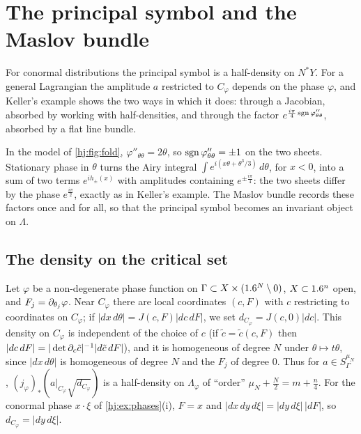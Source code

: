 \section{The principal symbol and the Maslov bundle}\label{hj:sec:lagrangian-symbol}

For conormal distributions the principal symbol is a half-density on $N^*Y$. For a
general Lagrangian the amplitude $a$ restricted to $C_\varphi$ depends on the phase
$\varphi$, and Keller's example shows the two ways in which it does: through a
Jacobian, absorbed by working with half-densities, and through the factor
$e^{\frac{i\pi}4\operatorname{sgn}\varphi''_{\theta\theta}}$, absorbed by a flat line bundle.

\begin{discussion}
In the model of \cref{hj:fig:fold}, $\varphi''_{\theta\theta}=2\theta$, so
$\operatorname{sgn}\varphi''_{\theta\theta}=\pm1$ on the two sheets. Stationary phase in $\theta$
turns the Airy integral $\int e^{i(x\theta+\theta^3/3)}\,d\theta$, for $x<0$, into a
sum of two terms $e^{ih_\pm(x)}$ with amplitudes containing $e^{\pm\frac{i\pi}4}$: the
two sheets differ by the phase $e^{\frac{i\pi}2}$, exactly as in Keller's example.
The Maslov bundle records these factors once and for all, so that the principal
symbol becomes an invariant object on $\Lambda$.
\end{discussion}

\subsection{The density on the critical set}
Let $\varphi$ be a non-degenerate phase function on $\Gamma\subset
X\times(1.6^N\setminus0)$, $X\subset1.6^n$ open, and $F_j=\partial_{\theta_j}\varphi$.
Near $C_\varphi$ there are local coordinates $(c,F)$ with $c$ restricting to
coordinates on $C_\varphi$; if $|dx\,d\theta|=J(c,F)|dc\,dF|$, we set
$d_{C_\varphi}=J(c,0)|dc|$.  This density on $C_\varphi$ is independent of the
choice of $c$ (if $\tilde c=\tilde c(c,F)$ then
$|dc\,dF|=|\det\partial_c\tilde c|^{-1}|d\tilde c\,dF|$), and it is homogeneous of
degree $N$ under $\theta\mapsto t\theta$, since $|dx\,d\theta|$ is homogeneous of
degree $N$ and the $F_j$ of degree $0$.  Thus for $a\in S^{\mu_N}_\Gamma$,
$(j_\varphi)_*(a|_{C_\varphi}\sqrt{d_{C_\varphi}})$ is a half-density on
$\Lambda_\varphi$ of ``order'' $\mu_N+\frac N2=m+\frac n4$.  For the conormal
phase $x\cdot\xi$ of \cref{hj:ex:phases}(i), $F=x$ and
$|dx\,dy\,d\xi|=|dy\,d\xi|\,|dF|$, so $d_{C_\varphi}=|dy\,d\xi|$.

